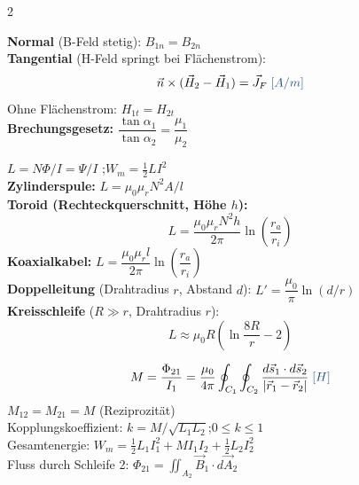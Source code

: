 \documentclass[a4paper, 7.5pt]{extarticle}
\begin{document}
\begin{multicols*}{2}
\begin{tcolorbox}[title={Grenzbedingungen Magnetostatik}]
\begin{center}
\end{center}
\textbf{Normal} (B-Feld stetig): $B_{1n} = B_{2n}$\\
\textbf{Tangential} (H-Feld springt bei Flächenstrom):
$$\vec{n}\times(\vec{H}_2-\vec{H}_1) = \vec{J}_F \;\text{\textcolor{boxtitle}{[\(A/m\)]}}$$
Ohne Flächenstrom: $H_{1t} = H_{2t}$\\[2pt]
\textbf{Brechungsgesetz:} $\dfrac{\tan\alpha_1}{\tan\alpha_2} = \dfrac{\mu_1}{\mu_2}$
\end{tcolorbox}

\begin{tcolorbox}[title={Induktivitäten -- alle Geometrien}]
$L = N\Phi/I = \Psi/I$ \;\text{\textcolor{boxtitle}{[\(H = Vs/A\)]}};\quad $W_m = \tfrac{1}{2}LI^2$ \;\text{\textcolor{boxtitle}{[\(J\)]}}\\[3pt]
\textbf{Zylinderspule:} $L = \mu_0\mu_r N^2 A/l$\\
\textbf{Toroid (Rechteckquerschnitt, Höhe $h$):}
$$L = \frac{\mu_0\mu_r N^2 h}{2\pi}\ln\!\left(\frac{r_a}{r_i}\right)$$
\textbf{Koaxialkabel:} $L = \dfrac{\mu_0\mu_r l}{2\pi}\ln\!\left(\dfrac{r_a}{r_i}\right)$\\
\textbf{Doppelleitung} (Drahtradius $r$, Abstand $d$): $L' = \dfrac{\mu_0}{\pi}\ln(d/r)$ \;\text{\textcolor{boxtitle}{[\(H/m\)]}}\\[2pt]
\textbf{Kreisschleife} ($R\gg r$, Drahtradius $r$):
$$L \approx \mu_0 R\!\left(\ln\frac{8R}{r}-2\right)$$
\end{tcolorbox}

\begin{tcolorbox}[title={Gegeninduktivität \& magnetische Kopplung}]
$$M = \frac{\Phi_{21}}{I_1} = \frac{\mu_0}{4\pi}\oint_{C_1}\oint_{C_2}\frac{d\vec{s}_1\cdot d\vec{s}_2}{|\vec{r}_1-\vec{r}_2|} \;\text{\textcolor{boxtitle}{[\(H\)]}}$$
$M_{12}=M_{21}=M$ (Reziprozität)\\
Kopplungskoeffizient: $k = M/\sqrt{L_1 L_2}$;\quad $0\leq k\leq1$\\
Gesamtenergie: $W_m = \tfrac{1}{2}L_1 I_1^2 + MI_1I_2 + \tfrac{1}{2}L_2 I_2^2$\\
Fluss durch Schleife 2: $\Phi_{21} = \iint_{A_2}\vec{B}_1\cdot d\vec{A}_2$
\end{tcolorbox}


\end{multicols*}
\end{document}
